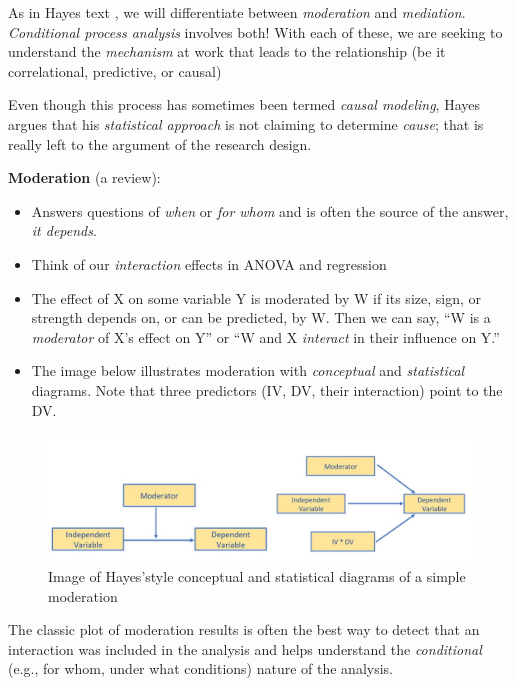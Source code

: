 \documentclass[
  11pt,
]{book}
\providecommand{\tightlist}{%
  \setlength{\itemsep}{0pt}\setlength{\parskip}{0pt}}
\begin{document}
As in Hayes text \citeyearpar{hayes_introduction_2018}, we will differentiate between \emph{moderation} and \emph{mediation}. \emph{Conditional process analysis} involves both! With each of these, we are seeking to understand the \emph{mechanism} at work that leads to the relationship (be it correlational, predictive, or causal)

Even though this process has sometimes been termed \emph{causal modeling}, Hayes argues that his \emph{statistical approach} is not claiming to determine \emph{cause}; that is really left to the argument of the research design.

\textbf{Moderation} (a review):

\begin{itemize}
\tightlist
\item
  Answers questions of \emph{when} or \emph{for whom} and is often the source of the answer, \emph{it depends}.
\item
  Think of our \emph{interaction} effects in ANOVA and regression
\item
  The effect of X on some variable Y is moderated by W if its size, sign, or strength depends on, or can be predicted, by W. Then we can say, ``W is a \emph{moderator} of X's effect on Y'' or ``W and X \emph{interact} in their influence on Y.''
\item
  The image below illustrates moderation with \emph{conceptual} and \emph{statistical} diagrams. Note that three predictors (IV, DV, their interaction) point to the DV.
\end{itemize}

\begin{figure}
\centering
\includegraphics{images/SimpleMed/ModConcStat.jpg}
\caption{Image of Hayes'style conceptual and statistical diagrams of a simple moderation}
\end{figure}

The classic plot of moderation results is often the best way to detect that an interaction was included in the analysis and helps understand the \emph{conditional} (e.g., for whom, under what conditions) nature of the analysis.
\end{document}
